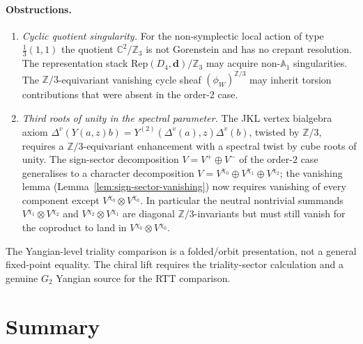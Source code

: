 \documentclass[11pt]{amsart}
\theoremstyle{definition}
\theoremstyle{remark}
\begin{document}
\paragraph{Obstructions.}
\begin{enumerate}[label=\textup{(O\arabic*)}]
\item \emph{Cyclic quotient singularity.}
  For the non-symplectic local action of type $\frac{1}{3}(1,1)$ the
  quotient $\mathbb{C}^2/\mathbb{Z}_3$ is not Gorenstein and has no
  crepant resolution. The representation stack
  $\mathrm{Rep}(D_4, \mathbf{d})/\mathbb{Z}_3$ may acquire
  non-$\mathbb{A}_1$ singularities. The $\mathbb{Z}/3$-equivariant
  vanishing cycle sheaf $(\phi_W)^{\mathbb{Z}/3}$ may inherit
  torsion contributions that were absent in the order-$2$ case.
\item \emph{Third roots of unity in the spectral parameter.}
  The JKL vertex bialgebra axiom $\Delta^v(Y(a, z)b) = Y^{(2)}(\Delta^v(a),
  z)\Delta^v(b)$, twisted by $\mathbb{Z}/3$, requires a
  $\mathbb{Z}/3$-equivariant enhancement with a spectral twist by
  cube roots of unity. The sign-sector decomposition
  $V = V^+ \oplus V^-$ of the order-$2$ case generalises to a
  character decomposition $V = V^{\chi_0} \oplus V^{\chi_1} \oplus V^{\chi_2}$;
  the vanishing lemma
  (Lemma~\ref{lem:sign-sector-vanishing}) now requires vanishing of
  every component except $V^{\chi_0}\otimes V^{\chi_0}$. In
  particular the neutral nontrivial summands
  $V^{\chi_1}\otimes V^{\chi_2}$ and
  $V^{\chi_2}\otimes V^{\chi_1}$ are diagonal
  $\mathbb{Z}/3$-invariants but must still vanish for the coproduct to
  land in $V^{\chi_0}\otimes V^{\chi_0}$.
\end{enumerate}

The Yangian-level triality comparison is a folded/orbit presentation,
not a general fixed-point equality. The chiral lift requires the
triality-sector calculation and a genuine $G_2$ Yangian source for
the RTT comparison.

\section{Summary}
\label{sec:summary-folding}
\end{document}
